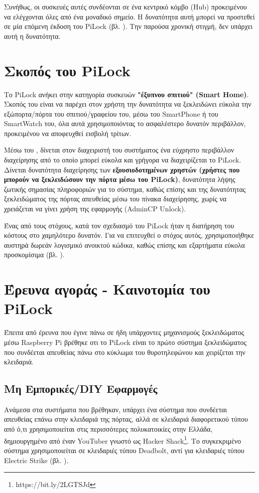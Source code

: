 	Συνήθως, οι συσκευές αυτές συνδέονται σε ένα κεντρικό κόμβο (Hub) προκειμένου να ελέγχονται όλες από ένα μοναδικό σημείο. Η δυνατότητα αυτή μπορεί να προστεθεί σε μία επόμενη έκδοση του PiLock (βλ. ). Την παρούσα χρονική στιγμή, δεν υπάρχει αυτή η δυνατότητα.

\section{Σκοπός του PiLock}
	Το PiLock ανήκει στην κατηγορία συσκευών \textbf{"έξυπνου σπιτιού" (Smart Home)}. Σκοπός του είναι να παρέχει στον χρήστη την δυνατότητα να ξεκλειδώνει εύκολα την εξώπορτα/πόρτα του σπιτιού/γραφείου του, μέσω του SmartPhone ή του SmartWatch του, όλα αυτά χρησιμοποιόντας το ασφαλέστερο δυνατόν περιβάλλον, προκειμένου να αποφευχθεί εισβολή τρίτων.

	Μέσω του \textbf{}, δίνεται στον διαχειριστή του συστήματος ένα εύχρηστο περιβάλλον διαχείρησης από το οποίο μπορεί εύκολα και γρήγορα να διαχειρίζεται το PiLock. Δίνεται δυνατότητα διαχείρησης των \textbf{εξουσιοδοτημένων χρηστών (χρήστες που μπορούν να ξεκλειδώσουν την πόρτα μέσω του PiLock)}, δυνατότητα λήψης ζωτικής σημασίας πληροφοριών για το σύστημα, καθώς επίσης και της δυνατότητας ξεκλειδώματος της πόρτας απευθείας μέσω του πίνακα διαχείρησης, χωρίς να χρειάζεται να γίνει χρήση της εφαρμογής (AdminCP Unlock).

	Ένας από τους στόχους, κατά τον σχεδιασμό του PiLock ήταν η διατήρηση του κόστους στο χαμηλότερο δυνατόν. Για να επιτευχθεί ο στόχος αυτός, χρησιμοποιήθηκε αυστηρά δωρεάν λογισμικό ανοικτού κώδικα, καθώς επίσης και εξαρτήματα εύκολα προσκομίσιμα (βλ. ).

\section{Έρευνα αγοράς - Καινοτομία του PiLock}
	Έπειτα από έρευνα που έγινε πάνω σε ήδη υπάρχοντες μηχανισμούς ξεκλειδώματος μέσω Raspberry Pi βρέθηκε οτι το PiLock είναι το πρώτο σύστημα ξεκλειδώματος που συνδέεται απευθείας πάνω στο κύκλωμα του θυροτηλεφώνου και χειρίζεται την κλειδαριά. 

	\subsection{Μη Εμπορικές/DIY Εφαρμογές}
		Ανάμεσα στα συστήματα που βρέθηκαν, υπάρχει ένα σύστημα που συνδέεται απευθείας επάνω στην κλειδαριά της πόρτας, αλλά σε κλειδαριά διαφορετικού τύπου από ό,τι χρησιμοποιείται στις περισσότερες πολυκατοικίες στην Ελλάδα, δημιουργημένο από έναν YouTuber γνωστό ως Hacker Shack\footnote{https://bit.ly/2LGTSJd}. Το συγκεκριμένο σύστημα χρησιμοποιείται σε κλειδαριές τύπου Deadbolt, αντί για κλειδαριές τύπου Electric Strike (βλ. ).

